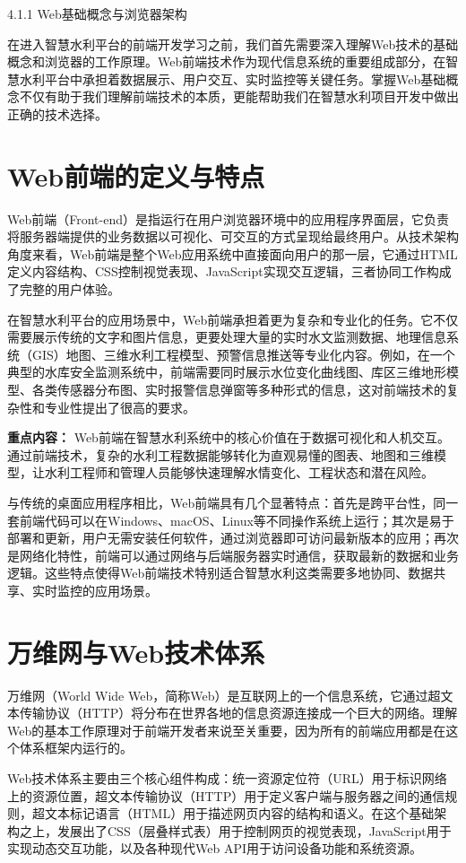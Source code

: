  4.1.1 Web基础概念与浏览器架构

在进入智慧水利平台的前端开发学习之前，我们首先需要深入理解Web技术的基础概念和浏览器的工作原理。Web前端技术作为现代信息系统的重要组成部分，在智慧水利平台中承担着数据展示、用户交互、实时监控等关键任务。掌握Web基础概念不仅有助于我们理解前端技术的本质，更能帮助我们在智慧水利项目开发中做出正确的技术选择。

\section{Web前端的定义与特点}

Web前端（Front-end）是指运行在用户浏览器环境中的应用程序界面层，它负责将服务器端提供的业务数据以可视化、可交互的方式呈现给最终用户。从技术架构角度来看，Web前端是整个Web应用系统中直接面向用户的那一层，它通过HTML定义内容结构、CSS控制视觉表现、JavaScript实现交互逻辑，三者协同工作构成了完整的用户体验。

在智慧水利平台的应用场景中，Web前端承担着更为复杂和专业化的任务。它不仅需要展示传统的文字和图片信息，更要处理大量的实时水文监测数据、地理信息系统（GIS）地图、三维水利工程模型、预警信息推送等专业化内容。例如，在一个典型的水库安全监测系统中，前端需要同时展示水位变化曲线图、库区三维地形模型、各类传感器分布图、实时报警信息弹窗等多种形式的信息，这对前端技术的复杂性和专业性提出了很高的要求。

\textbf{重点内容：} Web前端在智慧水利系统中的核心价值在于数据可视化和人机交互。通过前端技术，复杂的水利工程数据能够转化为直观易懂的图表、地图和三维模型，让水利工程师和管理人员能够快速理解水情变化、工程状态和潜在风险。

与传统的桌面应用程序相比，Web前端具有几个显著特点：首先是跨平台性，同一套前端代码可以在Windows、macOS、Linux等不同操作系统上运行；其次是易于部署和更新，用户无需安装任何软件，通过浏览器即可访问最新版本的应用；再次是网络化特性，前端可以通过网络与后端服务器实时通信，获取最新的数据和业务逻辑。这些特点使得Web前端技术特别适合智慧水利这类需要多地协同、数据共享、实时监控的应用场景。

\section{万维网与Web技术体系}

万维网（World Wide Web，简称Web）是互联网上的一个信息系统，它通过超文本传输协议（HTTP）将分布在世界各地的信息资源连接成一个巨大的网络。理解Web的基本工作原理对于前端开发者来说至关重要，因为所有的前端应用都是在这个体系框架内运行的。

Web技术体系主要由三个核心组件构成：统一资源定位符（URL）用于标识网络上的资源位置，超文本传输协议（HTTP）用于定义客户端与服务器之间的通信规则，超文本标记语言（HTML）用于描述网页内容的结构和语义。在这个基础架构之上，发展出了CSS（层叠样式表）用于控制网页的视觉表现，JavaScript用于实现动态交互功能，以及各种现代Web API用于访问设备功能和系统资源。

